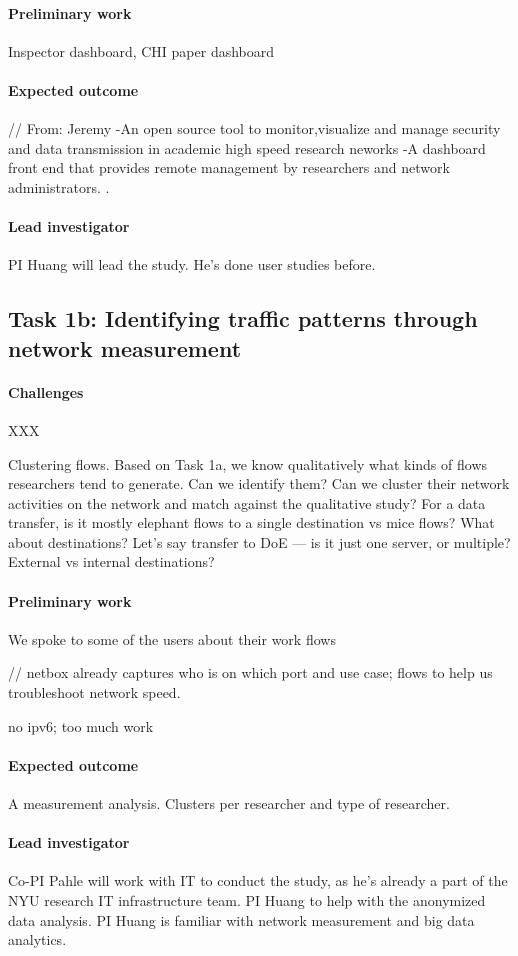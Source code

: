 \paragraph{Preliminary work}
Inspector dashboard, CHI paper dashboard

\paragraph{Expected outcome}

// From: Jeremy
-An open source tool to monitor,visualize and manage security and data transmission in academic high speed research neworks
-A dashboard front end that  provides remote management by researchers and network administrators. .

\paragraph{Lead investigator}
PI Huang will lead the study. He's done user studies before.






\subsection{Task 1b: Identifying traffic patterns through network measurement}


\paragraph{Challenges} XXX

Clustering flows. Based on Task 1a, we know qualitatively what kinds of flows researchers tend to generate. Can we identify them? Can we cluster their network activities on the network and match against the qualitative study? For a data transfer, is it mostly elephant flows to a single destination vs mice flows? What about destinations? Let's say transfer to DoE — is it just one server, or multiple? External vs internal destinations?

\paragraph{Preliminary work} We spoke to some of the users about their work flows

// netbox already captures who is on which port and use case; flows to help us troubleshoot network speed.

no ipv6; too much work


\paragraph{Expected outcome} A measurement analysis. Clusters per researcher and type of researcher.

\paragraph{Lead investigator} Co-PI Pahle will work with IT to conduct the study, as he's already a part of the NYU research IT infrastructure team. PI Huang to help with the anonymized data analysis. PI Huang is familiar with network measurement and big data analytics.
